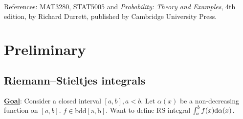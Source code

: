 \documentclass[10pt,a4paper]{article}
\begin{document}
	\MakeScribeTop
	\tableofcontents


References: MAT3280, STAT5005 and \textit{Probability: Theory and Examples}, 4th edition, by Richard Durrett, published by Cambridge University Press.

\section{Preliminary}\label{sec:premi}
\subsection{Riemann--Stieltjes integrals}\label{sec:RS-int}
\underline{\textbf{Goal}}: Consider a closed interval $[a,b], a<b$. Let $\alpha(x)$ be a non-decreasing function on $[a,b]$. $f\in \mathrm{bdd[a,b]}$.  Want to define RS integral $\int_{a}^{b}f(x)\mathrm{d}\alpha(x)$. 
\end{document}
